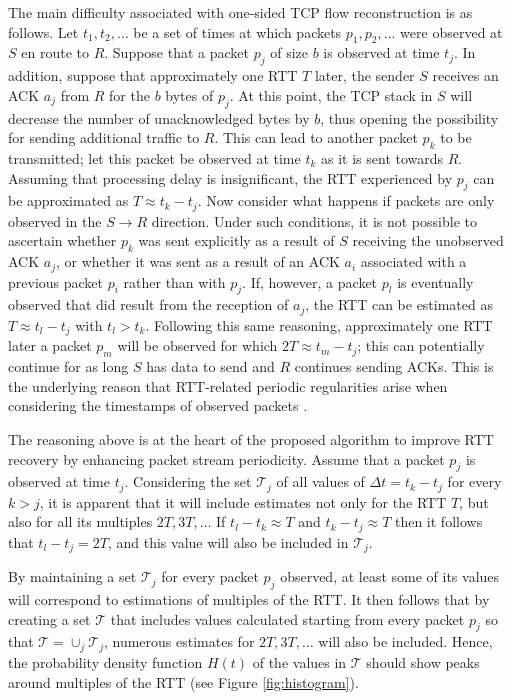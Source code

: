 %
%
The main difficulty associated with one-sided \ac{TCP} flow reconstruction is as follows.
Let $t_1, t_2, \ldots$ be a set of times at which packets $p_1, p_2, \ldots$ were observed at $S$ en route to $R$.
Suppose that a packet $p_j$ of size $b$ is observed at time $t_j$.
In addition, suppose that approximately one \ac{RTT} $T$ later, the sender $S$ receives an \ac{ACK} $a_j$ from $R$ for the $b$ bytes of $p_j$.
At this point, the \ac{TCP} stack in $S$ will decrease the number of unacknowledged bytes by $b$, thus opening the possibility for sending additional traffic to $R$.
This can lead to another packet $p_k$ to be transmitted; let this packet be observed at time $t_k$ as it is sent towards $R$.
Assuming that processing delay is insignificant, the \ac{RTT} experienced by $p_j$ can be approximated as $T \approx t_k - t_j$.
Now consider what happens if packets are only observed in the $S \rightarrow R$ direction.
Under such conditions, it is not possible to ascertain whether $p_k$ was sent explicitly as a result of $S$ receiving the unobserved \ac{ACK} $a_j$, or whether it was sent as a result of an \ac{ACK} $a_i$ associated with a previous packet $p_i$ rather than with $p_j$.
If, however, a packet $p_l$ is eventually observed that did result from the reception of $a_j$, the \ac{RTT} can be estimated as $T \approx t_l - t_j$ with $t_l > t_k$.
Following this same reasoning, approximately one \ac{RTT} later a packet $p_m$ will be observed for which $2T \approx t_m - t_j$; this can potentially continue for as long $S$ has data to send and $R$ continues sending \acp{ACK}.
This is the underlying reason that \ac{RTT}-related periodic regularities arise when considering the timestamps of observed packets \cite{Qian:2009p429}.

The reasoning above is at the heart of the proposed algorithm to improve \ac{RTT} recovery by enhancing packet stream periodicity. 
Assume that a packet $p_j$ is observed at time $t_j$. 
Considering the set $\mathcal{T}_j$ of all values of $\Delta t = t_k - t_j$ for every $k > j$, it is apparent that it will include estimates not only for the \ac{RTT} $T$, but also for all its multiples $2T, 3T, \ldots$ 
If $t_l-t_k \approx T$ and $t_k - t_j \approx T$ then it follows that $t_l - t_j = 2T$, and this value will also be included in $\mathcal{T}_j$. 

By maintaining a set $\mathcal{T}_j$ for every packet $p_j$ observed, at least some of its values will correspond to estimations of multiples of the \ac{RTT}. 
It then follows that by creating a set $\mathcal{T}$ that includes values calculated starting from every packet $p_j$ so that $\mathcal{T} = \cup_j \mathcal{T}_j$, numerous estimates for $2T, 3T, \ldots$ will also be included. 
Hence, the probability density function $H(t)$ of the values in $\mathcal{T}$ should show peaks around multiples of the \ac{RTT} (see Figure \ref{fig:histogram}). 

